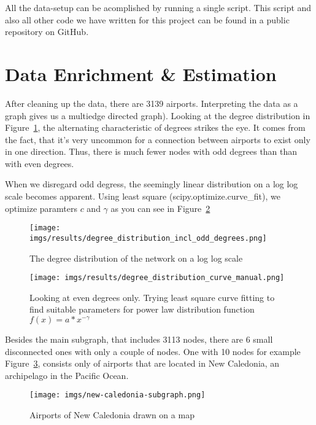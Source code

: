 \documentclass[twocolumn]{tum-article}
\begin{document}
All the data-setup can be acomplished by running a single script.
This script and also all other code we have written for this project can be found in a public repository on GitHub\cite{repository}.

\section{Data Enrichment \& Estimation}
After cleaning up the data, there are 3139 airports. 
Interpreting the data as a graph gives us a multiedge directed graph).
Looking at the degree distribution in Figure~\ref{fig:degree_distribution}, the alternating characteristic of degrees strikes the eye. It comes from the fact, that it's very uncommon for a connection between airports to exist only in one direction. Thus, there is much fewer nodes with odd degrees than than with even degrees. 

When we disregard odd degress, the seemingly linear distribution on a log log scale becomes apparent. Using least square (scipy.optimize.curve\_fit), we optimize paramters $c$ and $\gamma$ as you can see in Figure~\ref{fig:degree_distribution_curves}

\begin{figure}
	\centering
	\texttt{[image: imgs/results/degree\_distribution\_incl\_odd\_degrees.png]}
	\caption{
The degree distribution of the network on a log log scale }
	\label{fig:degree_distribution}
\end{figure}

\begin{figure}
	\centering
	\texttt{[image: imgs/results/degree\_distribution\_curve\_manual.png]}
	\caption{
Looking at even degrees only. Trying least square curve fitting to find suitable parameters for power law distribution function $f(x) = a * x^{-\gamma}$}
	\label{fig:degree_distribution_curves}
\end{figure}

Besides the main subgraph, that includes 3113 nodes, there are 6 small disconnected ones with only a couple of nodes.
One with 10 nodes for example Figure~\ref{fig:new_caledonia}, consists only of airports that are located in New Caledonia, an archipelago in the Pacific Ocean. 
\begin{figure}
	\centering
	\texttt{[image: imgs/new-caledonia-subgraph.png]}
	\caption{Airports of New Caledonia drawn on a map}
	\label{fig:new_caledonia}
\end{figure}
\end{document}

